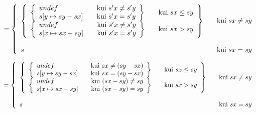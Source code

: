 \(
= 
\left\{
  \begin{array}{l l}
  \left\{
    \begin{array}{l l}
    \left\{
      \begin{array}{l l}
        undef & \quad \text{kui}\ s'x \neq s'y \\
        s[y \mapsto sy - sx] & \quad \text{kui}\ s'x = s'y\\
      \end{array}
    \right\} & \quad \text{kui}\ sx \leq sy
\\
    \left\{
      \begin{array}{l l}
        undef & \quad \text{kui}\ s'x \neq s'y \\
        s[x \mapsto sx - sy] & \quad \text{kui}\ s'x = s'y\\
      \end{array}
    \right\} & \quad \text{kui}\ sx > sy
    \end{array}
  \right\}
  &  \quad \text{kui}\ sx \neq sy \\
\\
  s   & \quad \text{kui}\ sx = sy\\
  \end{array}
\right.
\)

\(
 = 
\left\{
  \begin{array}{l l}
  \left\{
    \begin{array}{l l}
    \left\{
      \begin{array}{l l}
        undef & \quad \text{kui}\ sx \neq (sy - sx) \\
        s[y \mapsto sy - sx] & \quad \text{kui}\ sx = (sy - sx)
      \end{array}
    \right\} & \quad \text{kui}\ sx \leq sy
    \\
    \left\{
      \begin{array}{l l}
        undef & \quad \text{kui}\ (sx - sy) \neq sy \\
        s[x \mapsto sx - sy] & \quad \text{kui}\ (sx - sy) = sy\\
      \end{array}
    \right\} & \quad \text{kui}\ sx > sy
    \end{array}
  \right\}
  &  \quad \text{kui}\ sx \neq sy \\
  \\
  s   & \quad \text{kui}\ sx = sy\\
  \end{array}
\right.
\)

